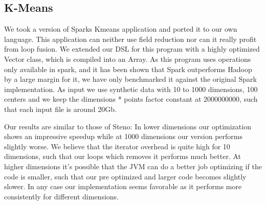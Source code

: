 \subsection{K-Means}
\label{subsec:kmeans}
We took a version of Sparks Kmeans application and ported it to our own language. This application can neither use field reduction nor can it really profit from loop fusion. We extended our DSL for this program with a highly optimized Vector class, which is compiled into an Array. As this program uses operations only available in spark, and it has been shown that Spark outperforms Hadoop by a large margin for it, we have only benchmarked it against the original Spark implementation. As input we use synthetic data with 10 to 1000 dimensions, 100 centers and we keep the dimensions * points factor constant at 2000000000, such that each input file is around 20Gb. 

Our results are similar to those of Steno: In lower dimensions our optimization shows an impressive speedup while at 1000 dimensions our version performs slightly worse. We believe that the iterator overhead is quite high for 10 dimensions, such that our loops which removes it performs much better. At higher dimensions it's possible that the JVM can do a better job optimizing if the code is smaller, such that our pre optimized and larger code becomes slightly slower. In any case our implementation seems favorable as it performs more consistently for different dimensions.